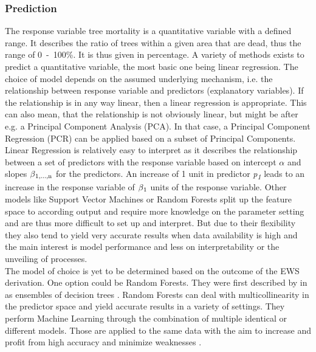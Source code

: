 \subsubsection{Prediction}
The response variable tree mortality is a quantitative variable with a defined range. It describes the ratio of trees within a given area that are dead, thus the range of 0~-~100\%. It is thus given in percentage. A variety of methods exists to predict a quantitative variable, the most basic one being linear regression. The choice of model depends on the assumed underlying mechanism, i.e. the relationship between response variable and predictors (explanatory variables). If the relationship is in any way linear, then a linear regression is appropriate. This can also mean, that the relationship is not obviously linear, but might be after e.g. a Principal Component Analysis (PCA). In that case, a Principal Component Regression (PCR) can be applied based on a subset of Principal Components. Linear Regression is relatively easy to interpret as it describes the relationship between a set of predictors with the response variable based on intercept $\alpha$ and slopes $\beta\textsubscript{1,...,n}$ for the predictors. An increase of 1 unit in predictor \textit{p\textsubscript{1}} leads to an increase in the response variable of $\beta\textsubscript{1}$ units of the response variable. Other models like Support Vector Machines or Random Forests split up the feature space to according output and require more knowledge on the parameter setting and are thus more difficult to set up and interpret. But due to their flexibility they also tend to yield very accurate results when data availability is high and the main interest is model performance and less on interpretability or the unveiling of processes.\\
The model of choice is yet to be determined based on the outcome of the EWS derivation. One option could be Random Forests. They were first described by \citeauthor{breiman1999} in \citeyear{breiman1999} as ensembles of decision trees \citep{breiman1999}. Random Forests can deal with multicollinearity in the predictor space and yield accurate results in a variety of settings. They perform Machine Learning through the combination of multiple identical or different models. Those are applied to the same data with the aim to increase and profit from high accuracy and minimize weaknesses \citep{rodriguez2012}.\\
